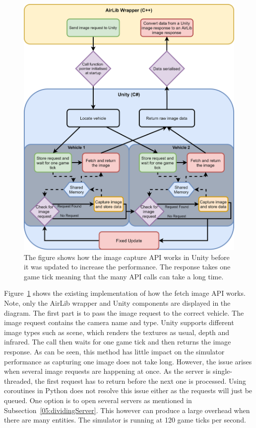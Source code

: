 \begin{figure}[p]
    \centering
    \includegraphics[width=1.0\textwidth]{06_Implementation/00_AirSim/Diagrams/imagecapture.png}
    \caption[Get images API]{The figure shows how the image capture API works in Unity before it was updated to increase the performance. The response takes one game tick meaning that the many API calls can take a long time.} \label{06:imageCapture}
\end{figure}

Figure~\ref{06:imageCapture} shows the existing implementation of how the fetch image API works. Note, only the AirLib wrapper and Unity components are displayed in the diagram. The first part is to pass the image request to the correct vehicle. The image request contains the camera name and type. Unity supports different image types such as scene, which renders the textures as usual, depth and infrared. The call then waits for one game tick and then returns the image response. As can be seen, this method has little impact on the simulator performance as capturing one image does not take long. However, the issue arises when several image requests are happening at once. As the server is single-threaded, the first request has to return before the next one is processed. Using coroutines in Python does not resolve this issue either as the requests will just be queued. One option is to open several servers as mentioned in Subsection~\ref{05:dividingServer}. This however can produce a large overhead when there are many entities. The simulator is running at 120 game ticks per second.

